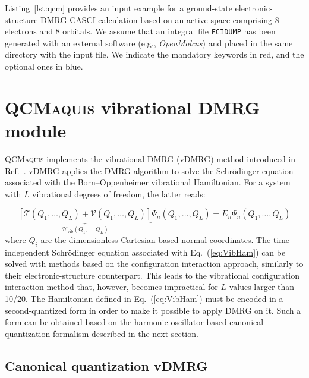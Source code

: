 \documentclass[bibliography=totoc,12pt,a4paper]{scrartcl}
\newcommand{\qcm}{\textsc{QCMaquis}}
\begin{document}
Listing~\ref{lst:qcm} provides an input example for a ground-state electronic-structure DMRG-CASCI calculation based on an active space comprising 8 electrons and 8 orbitals.
We assume that an integral file \texttt{FCIDUMP} has been generated with an external software (e.g., \textsl{OpenMolcas}) and placed in the same directory with the input file.
We indicate the mandatory keywords in red, and the optional ones in blue.

\section{\qcm{} vibrational DMRG module}
\label{sec:vDMRG}

\qcm{} implements the vibrational DMRG (vDMRG) method introduced in Ref.~.
vDMRG applies the DMRG algorithm to solve the Schr\"odinger equation associated with the Born--Oppenheimer vibrational Hamiltonian.
For a system with $L$ vibrational degrees of freedom, the latter reads:

\begin{equation}
  \underbrace{\left[ \mathcal{T}(Q_1, \ldots, Q_L) + \mathcal{V}(Q_1, \ldots, Q_L) \right]}_{\mathcal{H}_\text{vib}(Q_1, \ldots, Q_L)} \Psi_n(Q_1, \ldots, Q_L) = E_n \Psi_n(Q_1, \ldots, Q_L)
  \label{eq:VibHam}
\end{equation}
%
where $Q_i$ are the dimensionless Cartesian-based normal coordinates.
The time-independent Schr\"odinger equation associated with Eq.~(\ref{eq:VibHam}) can be solved with methods based on the configuration interaction approach, similarly to their electronic-structure counterpart.
This leads to the vibrational configuration interaction method that, however, becomes impractical for $L$ values larger than 10/20.
The Hamiltonian defined in Eq.~(\ref{eq:VibHam}) must be encoded in a second-quantized form in order to make it possible to apply DMRG on it.
Such a form can be obtained based on the harmonic oscillator-based canonical quantization formalism\cite{Hirata2014_NormalOrdered} described in the next section.

\subsection{Canonical quantization vDMRG}
\label{sec:canonical}
\end{document}
